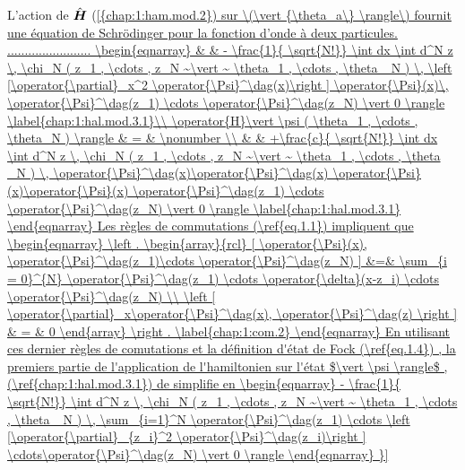 L’action de \(\hat{\bm{H}}\) (\ref{{chap:1:ham.mod.2}) sur \(\vert {\theta_a\} \rangle\) fournit une équation de Schrödinger pour la fonction d’onde à deux particules.
........................

\begin{eqnarray}
	& & - \frac{1}{ \sqrt{N!}} \int dx \int d^N z \, \chi_N ( z_1 , \cdots , z_N  ~\vert ~ \theta_1 , \cdots , \theta _N ) \,	\left [\operator{\partial}_x^2 \operator{\Psi}^\dag(x)\right ] \operator{\Psi}(x)\,  \operator{\Psi}^\dag(z_1) \cdots \operator{\Psi}^\dag(z_N) \vert 0 \rangle \label{chap:1:hal.mod.3.1}\\
	\operator{H}\vert \psi ( \theta_1 , \cdots , \theta_N ) \rangle & = & \nonumber \\
	& & +\frac{c}{ \sqrt{N!}} \int dx \int d^N z \, \chi_N ( z_1 , \cdots , z_N  ~\vert ~ \theta_1 , \cdots , \theta _N ) 	\, \operator{\Psi}^\dag(x)\operator{\Psi}^\dag(x) \operator{\Psi}(x)\operator{\Psi}(x)  \operator{\Psi}^\dag(z_1) \cdots \operator{\Psi}^\dag(z_N) \vert 0 \rangle \label{chap:1:hal.mod.3.1} 
\end{eqnarray}

Les règles de commutations (\ref{eq.1.1}) impliquent que 

\begin{eqnarray}
	\left . \begin{array}{rcl}
		[ \operator{\Psi}(x),  \operator{\Psi}^\dag(z_1)\cdots \operator{\Psi}^\dag(z_N)  ]  &=&  \sum_{i = 0}^{N} \operator{\Psi}^\dag(z_1) \cdots \operator{\delta}(x-z_i) \cdots \operator{\Psi}^\dag(z_N)  \\
		\left [ \operator{\partial}_x\operator{\Psi}^\dag(x),  \operator{\Psi}^\dag(z) \right ]   & =  & 0 
	\end{array} \right . \label{chap:1:com.2}
\end{eqnarray}


En utilisant ces dernier règles de comutations et la définition d'état de Fock (\ref{eq.1.4}) , la premiers partie de l'application de l'hamiltonien sur l'état $\vert \psi  \rangle$ , (\ref{chap:1:hal.mod.3.1}) de simplifie en 

\begin{eqnarray}
	 - \frac{1}{ \sqrt{N!}} \int d^N z \, \chi_N ( z_1 , \cdots , z_N  ~\vert ~ \theta_1 , \cdots , \theta _N ) \,	\sum_{i=1}^N  \operator{\Psi}^\dag(z_1) \cdots \left [\operator{\partial}_{z_i}^2 \operator{\Psi}^\dag(z_i)\right ] \cdots\operator{\Psi}^\dag(z_N) \vert 0 \rangle 	
\end{eqnarray}

}}
